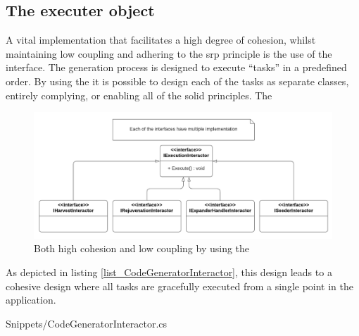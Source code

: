 \subsection{The executer object} \label{subsec_IExecutionInteractorObject}

A vital implementation that facilitates a high degree of cohesion, whilst maintaining
low coupling and adhering to the \gls{srp} principle is the use of the
 interface. The generation process is designed to
execute \enquote{tasks} in a predefined order. By using the
 it is possible to design each of the tasks as
separate classes, entirely complying, or enabling all of the \gls{solid} principles. The 

\begin{figure}[H]
    \centering
    \includegraphics[width=1\textwidth]{figures/class_diagram_iexecutioninteractor.pdf}
    \caption[Plugin Archticture]{Both high cohesion and low coupling by using the }
    \label{fig_iexecutioninteractor}
  \end{figure}


As depicted in listing \ref{list_CodeGeneratorInteractor}, this design leads to a cohesive
design where all tasks are gracefully executed from a single point in the application.
 
  {Snippets/CodeGeneratorInteractor.cs}